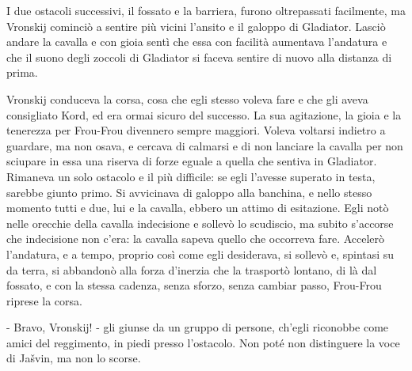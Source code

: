 I due ostacoli successivi, il fossato e la barriera, furono oltrepassati facilmente, ma Vronskij cominciò a sentire più vicini l'ansito e il galoppo di Gladiator. Lasciò andare la cavalla e con gioia sentì che essa con facilità aumentava l'andatura e che il suono degli zoccoli di Gladiator si faceva sentire di nuovo alla distanza di prima. 

Vronskij conduceva la corsa, cosa che egli stesso voleva fare e che gli aveva consigliato Kord, ed era ormai sicuro del successo. La sua agitazione, la gioia e la tenerezza per Frou-Frou divennero sempre maggiori. Voleva voltarsi indietro a guardare, ma non osava, e cercava di calmarsi e di non lanciare la cavalla per non sciupare in essa una riserva di forze eguale a quella che sentiva in Gladiator. Rimaneva un solo ostacolo e il più difficile: se egli l'avesse superato in testa, sarebbe giunto primo. Si avvicinava di galoppo alla banchina, e nello stesso momento tutti e due, lui e la cavalla, ebbero un attimo di esitazione. Egli notò nelle orecchie della cavalla indecisione e sollevò lo scudiscio, ma subito s'accorse che indecisione non c'era: la cavalla sapeva quello che occorreva fare. Accelerò l'andatura, e a tempo, proprio così come egli desiderava, si sollevò e, spintasi su da terra, si abbandonò alla forza d'inerzia che la trasportò lontano, di là dal fossato, e con la stessa cadenza, senza sforzo, senza cambiar passo, Frou-Frou riprese la corsa. 

- Bravo, Vronskij! - gli giunse da un gruppo di persone, ch'egli riconobbe come amici del reggimento, in piedi presso l'ostacolo. Non poté non distinguere la voce di Jašvin, ma non lo scorse. 

